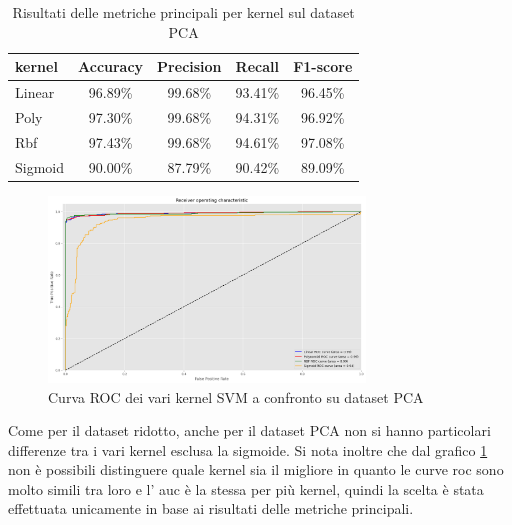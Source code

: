 \begin{table}[!ht]
    \centering
    \begin{tabular}{@{}lcccc@{}}
        \toprule
        \rowcolor[HTML]{EFEFEF}
        \textbf{kernel}                                                &
        \multicolumn{1}{l}{\cellcolor[HTML]{EFEFEF}\textbf{Accuracy}}  &
        \multicolumn{1}{l}{\cellcolor[HTML]{EFEFEF}\textbf{Precision}} &
        \multicolumn{1}{l}{\cellcolor[HTML]{EFEFEF}\textbf{Recall}}    &
        \multicolumn{1}{l}{\cellcolor[HTML]{EFEFEF}\textbf{F1-score}}                                          \\ \midrule
        Linear                                                         & 96.89\% & 99.68\% & 93.41\% & 96.45\% \\
        Poly                                                           & 97.30\% & 99.68\% & 94.31\% & 96.92\% \\
        Rbf                                                            & 97.43\% & 99.68\% & 94.61\% & 97.08\% \\
        Sigmoid                                                        & 90.00\% & 87.79\% & 90.42\% & 89.09\% \\ \bottomrule
    \end{tabular}
    \caption{Risultati delle metriche principali per kernel sul dataset PCA}
    \label{tab:top_metrics_kernels_pca}
\end{table}

\begin{figure}[!ht]
    \centering
    \includegraphics[width=0.75\textwidth]{img/svm/SVM_roc_pca.png}
    \caption{Curva ROC dei vari kernel SVM a confronto su dataset PCA}
    \label{fig:roc_SVM_PCA}
\end{figure}

Come per il dataset ridotto, anche per il dataset PCA non si hanno particolari
differenze tra i vari kernel esclusa la sigmoide. Si nota inoltre che dal
grafico \ref{fig:roc_SVM_PCA} non è possibili distinguere quale kernel sia
il migliore in quanto le curve roc sono molto simili tra loro e l' auc è la
stessa per più kernel, quindi la scelta è stata effettuata unicamente in base
ai risultati delle metriche principali.
\newpage

